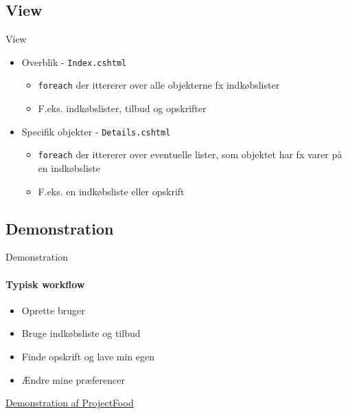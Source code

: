 \subsection{View}
\begin{frame}{View}
	\begin{itemize}
		\item Overblik - \texttt{Index.cshtml}
		\begin{itemize}
			\item \texttt{foreach} der ittererer over alle objekterne fx indkøbslister
			\item F.eks. indkøbslister, tilbud og opskrifter
		\end{itemize}
		\item Specifik objekter - \texttt{Details.cshtml}
		\begin{itemize}
			\item \texttt{foreach} der ittererer over eventuelle lister, som objektet har fx varer på en indkøbsliste
			\item F.eks. en indkøbsliste eller opskrift
		\end{itemize}
	\end{itemize}
\end{frame}

\subsection{Demonstration}
\begin{frame}{Demonstration}
	\framesubtitle{Typisk workflow}
	\begin{itemize}
	\item Oprette bruger
	\item Bruge indkøbsliste og tilbud
	\item Finde opskrift og lave min egen
	\item Ændre mine præferencer
	\end{itemize}
	\href{http://james:8080}{Demonstration af ProjectFood}
\end{frame}